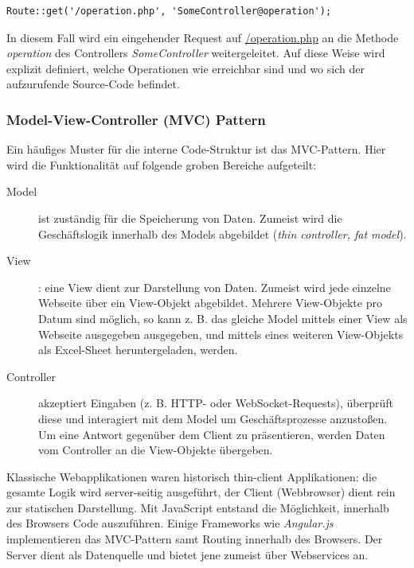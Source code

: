 \begin{verbatim}
Route::get('/operation.php', 'SomeController@operation');
\end{verbatim}

In diesem Fall wird ein eingehender Request auf \url{/operation.php} an die Methode \textit{operation} des Controllers \textit{SomeController} weitergeleitet. Auf diese Weise wird explizit definiert, welche Operationen wie erreichbar sind und wo sich der aufzurufende Source-Code befindet.

\subsubsection{Model-View-Controller (MVC) Pattern}

Ein häufiges Muster für die interne Code-Struktur ist das MVC-Pattern. Hier wird die Funktionalität auf folgende groben Bereiche aufgeteilt:

\begin{description}
	\item[Model] ist zuständig für die Speicherung von Daten. Zumeist wird die Geschäftslogik innerhalb des Models abgebildet (\textit{thin controller, fat model}).
	\item[View]: eine View dient zur Darstellung von Daten. Zumeist wird jede einzelne Webseite über ein View-Objekt abgebildet. Mehrere View-Objekte pro Datum sind möglich, so kann z. B. das gleiche Model mittels einer View als Webseite ausgegeben ausgegeben, und mittels eines weiteren View-Objekts als Excel-Sheet heruntergeladen, werden.
	\item[Controller] akzeptiert Eingaben (z. B. HTTP- oder WebSocket-Requests), überprüft diese und interagiert mit dem Model um Geschäftsprozesse anzustoßen. Um eine Antwort gegenüber dem Client zu präsentieren, werden Daten vom Controller an die View-Objekte übergeben.
\end{description}

Klassische Webapplikationen waren historisch thin-client Applikationen: die gesamte Logik wird server-seitig ausgeführt, der Client (Webbrowser) dient rein zur statischen Darstellung. Mit JavaScript entstand die Möglichkeit, innerhalb des Browsers Code auszuführen. Einige Frameworks wie \textit{Angular.js} implementieren das MVC-Pattern samt Routing innerhalb des Browsers. Der Server dient als Datenquelle und bietet jene zumeist über Webservices an.

